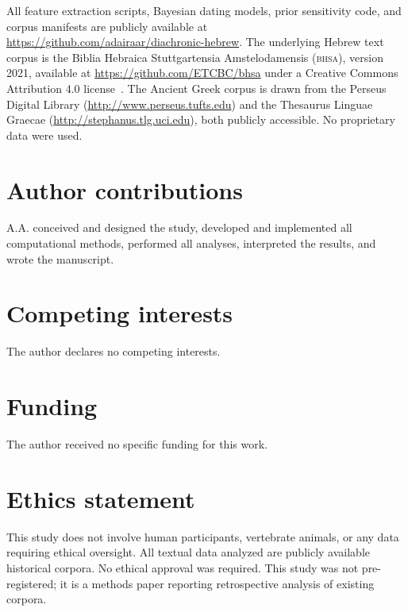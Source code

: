 \documentclass[10pt,letterpaper]{article}
\newcommand{\bhsa}{\textsc{bhsa}}
\begin{document}
All feature extraction scripts, Bayesian dating models, prior sensitivity
code, and corpus manifests are publicly available at
\url{https://github.com/adairaar/diachronic-hebrew}.  The underlying Hebrew text corpus is the Biblia
Hebraica Stuttgartensia Amstelodamensis (\bhsa{}), version 2021,
available at \url{https://github.com/ETCBC/bhsa} under a Creative Commons
Attribution 4.0 license~\cite{BHSA2021}.  The Ancient Greek corpus is
drawn from the Perseus Digital Library (\url{http://www.perseus.tufts.edu})
and the Thesaurus Linguae Graecae (\url{http://stephanus.tlg.uci.edu}),
both publicly accessible.  No proprietary data were used.

\section*{Author contributions}

A.A. conceived and designed the study, developed and implemented all
computational methods, performed all analyses, interpreted the results,
and wrote the manuscript.

\section*{Competing interests}

The author declares no competing interests.

\section*{Funding}

The author received no specific funding for this work.

\section*{Ethics statement}

This study does not involve human participants, vertebrate animals,
or any data requiring ethical oversight.  All textual data analyzed are
publicly available historical corpora.  No ethical approval was required.
This study was not pre-registered; it is a methods paper reporting
retrospective analysis of existing corpora.
\end{document}
